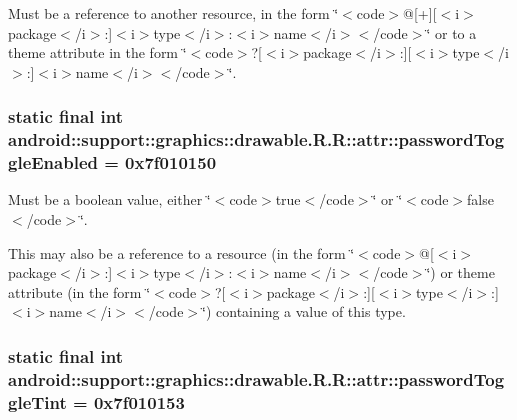Must be a reference to another resource, in the form \char`\"{}$<$code$>$@\mbox{[}+\mbox{]}\mbox{[}$<$i$>$package$<$/i$>$:\mbox{]}$<$i$>$type$<$/i$>$:$<$i$>$name$<$/i$>$$<$/code$>$\char`\"{} or to a theme attribute in the form \char`\"{}$<$code$>$?\mbox{[}$<$i$>$package$<$/i$>$:\mbox{]}\mbox{[}$<$i$>$type$<$/i$>$:\mbox{]}$<$i$>$name$<$/i$>$$<$/code$>$\char`\"{}. \hypertarget{classandroid_1_1support_1_1graphics_1_1drawable_1_1_r_1_1attr_84bafe465948182cb862d1a0de3ac098}{
\subsubsection[{passwordToggleEnabled}]{\setlength{\rightskip}{0pt plus 5cm}static final int android::support::graphics::drawable.R.R::attr::passwordToggleEnabled = 0x7f010150}}
\label{classandroid_1_1support_1_1graphics_1_1drawable_1_1_r_1_1attr_84bafe465948182cb862d1a0de3ac098}


Must be a boolean value, either \char`\"{}$<$code$>$true$<$/code$>$\char`\"{} or \char`\"{}$<$code$>$false$<$/code$>$\char`\"{}. 

This may also be a reference to a resource (in the form \char`\"{}$<$code$>$@\mbox{[}$<$i$>$package$<$/i$>$:\mbox{]}$<$i$>$type$<$/i$>$:$<$i$>$name$<$/i$>$$<$/code$>$\char`\"{}) or theme attribute (in the form \char`\"{}$<$code$>$?\mbox{[}$<$i$>$package$<$/i$>$:\mbox{]}\mbox{[}$<$i$>$type$<$/i$>$:\mbox{]}$<$i$>$name$<$/i$>$$<$/code$>$\char`\"{}) containing a value of this type. \hypertarget{classandroid_1_1support_1_1graphics_1_1drawable_1_1_r_1_1attr_d628199bf02a11fe9cfe57d414e3a826}{
\subsubsection[{passwordToggleTint}]{\setlength{\rightskip}{0pt plus 5cm}static final int android::support::graphics::drawable.R.R::attr::passwordToggleTint = 0x7f010153}}
\label{classandroid_1_1support_1_1graphics_1_1drawable_1_1_r_1_1attr_d628199bf02a11fe9cfe57d414e3a826}


